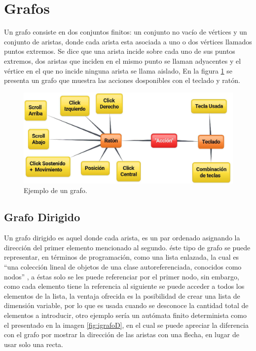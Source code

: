 
\section{Grafos}
Un grafo consiste en dos conjuntos finitos: un conjunto no vac\'io de
 v\'ertices y un conjunto de aristas, donde cada arista esta asociada 
 a uno o dos v\'ertices llamados puntos extremos\cite{SUSANNAS.EPP2012}. 
 Se dice que una arista incide sobre cada uno de sus puntos extremos, 
 dos aristas que inciden en el mismo punto se llaman adyacentes y el 
 v\'ertice en el que no incide ninguna arista se llama 
 aislado\cite{SUSANNAS.EPP2012}, En la figura \ref{fig:igrafo} se
 presenta un grafo que muestra las acciones dosponibles con el 
 teclado y rat\'on.
 
\begin{figure}[h]
\centering
\includegraphics[width=0.8\columnwidth]{chap3/Imagenes/Grafo.eps}
\caption{Ejemplo de un grafo.}
\label{fig:igrafo}
\end{figure}


\subsection{Grafo Dirigido}
Un grafo dirigido es aquel donde cada arista, es un 
 par ordenado asignando la direcci\'on del primer elemento mencionado 
 al segundo\cite{SUSANNAS.EPP2012}. \'este tipo de grafo se puede 
 representar, en t\'erminos de programaci\'on,  como una lista enlazada, 
 la cual es ``una colecci\'on lineal de objetos de una clase autoreferenciada, 
 conocidos como nodos'' \cite{deitel2008java}, a \'estas solo se les puede 
 referenciar por el primer nodo, sin embargo, como cada elemento tiene la 
 referencia al siguiente se puede acceder a todos los elementos de la lista, 
 la ventaja ofrecida es la posibilidad de crear una lista de dimensi\'on 
 variable, por lo que es usada cuando se desconoce la cantidad total de 
 elementos a introducir\cite{deitel2008java}, otro ejemplo ser\'ia un 
 aut\'omata finito determinista como el presentado en la imagen
 \ref{fig:igrafoD}, en el cual se puede apreciar la diferencia con el grafo 
 por mostrar la direcci\'on de las aristas con una flecha, en lugar de usar 
 solo una recta.
 
